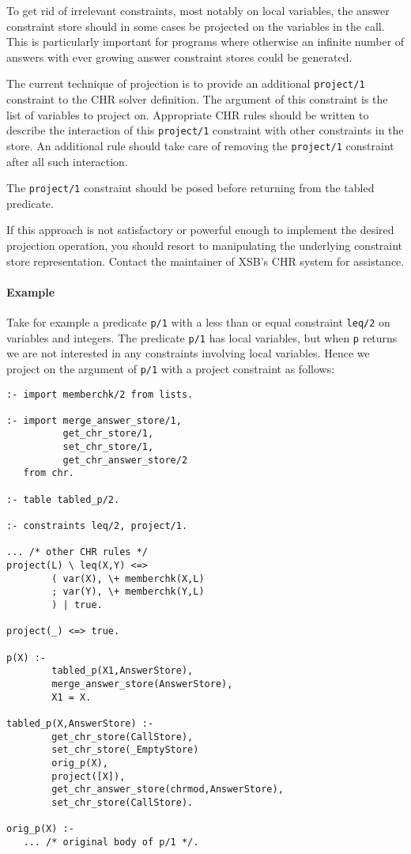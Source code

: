 To get rid of irrelevant constraints, most notably on local variables, the answer
constraint store should in some cases be projected on the variables in the call.
This is particularly important for programs where otherwise an infinite number 
of answers with ever growing answer constraint stores could be generated.

The current technique of projection is to provide an additional \texttt{project/1}
constraint to the CHR solver definition. The argument of this constraint is
the list of variables to project on. Appropriate CHR rules should be written
to describe the interaction of this \texttt{project/1} constraint with other
constraints in the store. An additional rule should take care of removing
the \texttt{project/1} constraint after all such interaction.

The \texttt{project/1} constraint should be posed before returning from the tabled
predicate.

If this approach is not satisfactory or powerful enough to implement the
desired projection operation, you should resort to manipulating the underlying
constraint store representation. Contact the maintainer of XSB's CHR system
for assistance.

\paragraph{Example}
Take for example a predicate \texttt{p/1} with a less than or equal constraint
\texttt{leq/2} on variables and integers. The predicate \texttt{p/1} has local
variables, but when \texttt{p} returns we are not interested in any constraints
involving local variables. Hence we project on the argument of \texttt{p/1}
with a project constraint as follows:

\begin{small}
\begin{verbatim}
:- import memberchk/2 from lists.

:- import merge_answer_store/1, 
          get_chr_store/1,
          set_chr_store/1,
          get_chr_answer_store/2
   from chr.

:- table tabled_p/2.

:- constraints leq/2, project/1.

... /* other CHR rules */
project(L) \ leq(X,Y) <=>
        ( var(X), \+ memberchk(X,L) 
        ; var(Y), \+ memberchk(Y,L)
        ) | true.
       
project(_) <=> true. 
        
p(X) :-
        tabled_p(X1,AnswerStore),
        merge_answer_store(AnswerStore),
        X1 = X.

tabled_p(X,AnswerStore) :-
        get_chr_store(CallStore),
        set_chr_store(_EmptyStore)
        orig_p(X),
        project([X]),
        get_chr_answer_store(chrmod,AnswerStore),
        set_chr_store(CallStore).
        
orig_p(X) :-
   ... /* original body of p/1 */.
\end{verbatim}
\end{small}

